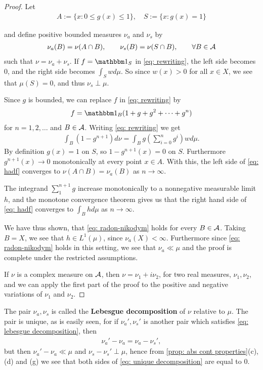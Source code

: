 \documentclass[../../main.tex]{subfiles}
\begin{document}
\begin{proof}
Let
\begin{align*}
	A:=\{x:0\le g(x) \le 1\}, \quad S:=\{x: g(x)=1 \}
\end{align*}

and define positive bounded measures $\nu_{a}$ and $\nu_{s}$ by
\begin{align*}
	\nu_{a}(B)=\nu(A\cap B), \qquad \nu_{s}(B)=\nu(S\cap B), \qquad \forall B\in \mathcal{A}
\end{align*}
such that $\nu=\nu_{a}+\nu_{s}$.
If $f=\ind{S}$ in \eqref{eq: rewriting}, the left side becomes $0$, and the right side becomes $\int_{S}wd\mu$. So since $w(x)>0$ for all $x\in X$, we see that $\mu(S)=0$, and thus $\nu_{s} \perp \mu$.

Since $g$ is bounded, we can replace $f$ in \eqref{eq: rewriting} by
\begin{align*}
	f=\ind{B}(1+g+g^{2}+\dots+g^{n})
\end{align*}
for $n=1,2, \dots$ and $B\in \mathcal{A}$. Writing \eqref{eq: rewriting} we get
\begin{align}
	\int_{B}(1-g^{n+1})d\nu = \int_{B}g\left(\sum_{i=0}^{n}g^{i}\right)wd\mu. \label{eq: hadf}
\end{align}
By definition $g(x)=1$ on $S$, so $1-g^{n+1}(x)=0$ on $S$. Furthermore $g^{n+1}(x)\to 0$ monotonically at every point $x\in A$. With this, the left side of \eqref{eq: hadf} converges to $\nu(A\cap B)=\nu_{a}(B)$ as $n\to \infty$.

The integrand $\sum_{1}^{n+1}g$ increase monotonically to a nonnegative measurable limit $h$, and the monotone convergence theorem gives us that the right hand side of \eqref{eq: hadf} converges to $\int_{B}hd\mu$ as $n\to \infty$.

We have thus shown, that \eqref{eq: radon-nikodym} holds for every $B\in \mathcal{A}$. Taking $B=X$, we see that $h\in L^{1}(\mu)$, since $\nu_{a}(X)<\infty$. Furthermore since \eqref{eq: radon-nikodym} holds in this setting, we see that $\nu_{a}\ll \mu$ and the proof is complete under the restricted assumptions.

If $\nu$ is a complex measure on $\mathcal{A}$, then $\nu=\nu_{1}+i\nu_{2}$, for two real measures, $\nu_{1}, \nu_{2}$, and we can apply the first part of the proof to the positive and negative variations of $\nu_{1}$ and $\nu_{2}$. %
\end{proof}



The pair $\nu_{a}, \nu_{s}$ is called the \textbf{Lebesgue decomposition} of $\nu$ relative to $\mu$. The pair is unique, as is easily seen, for if $\nu_{a}',\nu_{s}'$ is another pair which satisfies \eqref{eq: lebesgue decomposition}, then
\begin{align}
	\nu_{a}'-\nu_{a}=\nu_{a}-\nu_{s}', \label{eq: unique decomposition}
\end{align}
but then $\nu_{a}'-\nu_{a}\ll \mu$ and $\nu_{s}-\nu_{s}'\perp \mu$, hence from \cref{prop: abs cont properties}(c), (d) and (g) we see that both sides of \eqref{eq: unique decomposition} are equal to 0.
\end{document}
